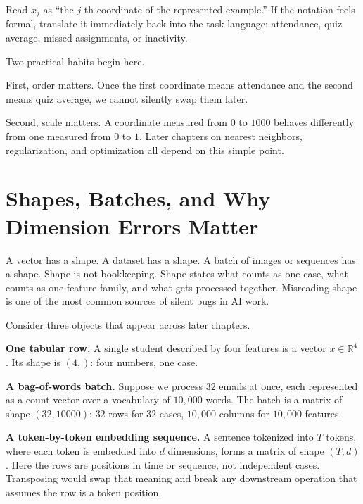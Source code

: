 \begin{prereqbridge}
Read \(x_j\) as ``the \(j\)-th coordinate of the represented example.'' If the notation feels formal, translate it immediately back into the task language: attendance, quiz average, missed assignments, or inactivity.
\end{prereqbridge}

Two practical habits begin here.

First, order matters. Once the first coordinate means attendance and the second means quiz average, we cannot silently swap them later.

Second, scale matters. A coordinate measured from \(0\) to \(1000\) behaves differently from one measured from \(0\) to \(1\). Later chapters on nearest neighbors, regularization, and optimization all depend on this simple point.

\section*{Shapes, Batches, and Why Dimension Errors Matter}

A vector has a shape. A dataset has a shape. A batch of images or sequences has a shape. Shape is not bookkeeping. Shape states what counts as one case, what counts as one feature family, and what gets processed together. Misreading shape is one of the most common sources of silent bugs in AI work.

Consider three objects that appear across later chapters.

\textbf{One tabular row.} A single student described by four features is a vector $x \in \mathbb{R}^4$. Its shape is $(4,)$: four numbers, one case.

\textbf{A bag-of-words batch.} Suppose we process $32$ emails at once, each represented as a count vector over a vocabulary of $10{,}000$ words. The batch is a matrix of shape $(32, 10000)$: $32$ rows for $32$ cases, $10{,}000$ columns for $10{,}000$ features.

\textbf{A token-by-token embedding sequence.} A sentence tokenized into $T$ tokens, where each token is embedded into $d$ dimensions, forms a matrix of shape $(T, d)$. Here the rows are positions in time or sequence, not independent cases. Transposing would swap that meaning and break any downstream operation that assumes the row is a token position.

